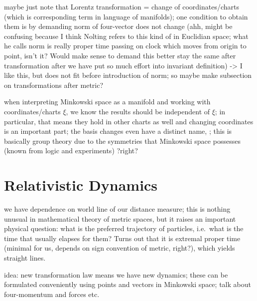 maybe just note that Lorentz transformation = change of coordinates/charts (which is corresponding term in language of manifolds); one condition to obtain them is by demanding norm of four-vector does not change (ahh, might be confusing because I think Nolting refers to this kind of in Euclidian space; what he calls norm is really proper time passing on clock which moves from origin to point, isn't it? Would make sense to demand this better stay the same after transformation after we have put so much effort into invariant definition) -> I like this, but does not fit before introduction of norm; so maybe make subsection on transformations after metric?





when interpreting Minkowski space as a manifold and working with coordinates/charts $\xi$, we know the results should be independent of $\xi$; in particular, that means they hold in other charts as well and changing coordinates is an important part; the basis changes even have a distinct name, ; this is basically group theory due to the symmetries that Minkowski space possesses (known from logic and experiments) ?right?




\newpage



	\section{Relativistic Dynamics}
we have dependence on world line of our distance measure; this is nothing unusual in mathematical theory of metric spaces, but it raises an important physical question: what is the preferred trajectory of particles, i.e.~what is the time that usually elapses for them? Turns out that it is extremal proper time (minimal for us, depends on sign convention of metric, right?), which yields straight lines.


idea: new transformation law means we have new dynamics; these can be formulated conveniently using points and vectors in Minkowski space; talk about four-momentum and forces etc.





